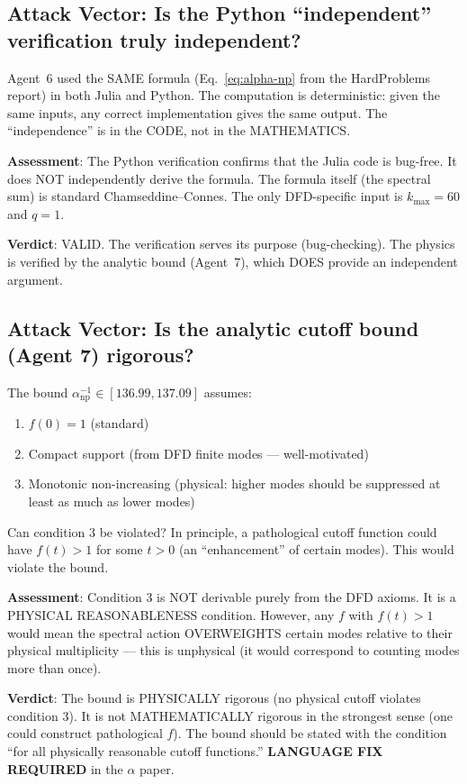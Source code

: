 \documentclass[11pt,a4paper]{article}
\begin{document}
\subsection{Attack Vector: Is the Python ``independent'' verification truly independent?}

Agent~6 used the SAME formula (Eq.~\ref{eq:alpha-np} from the HardProblems report) in both Julia and Python. The computation is deterministic: given the same inputs, any correct implementation gives the same output. The ``independence'' is in the CODE, not in the MATHEMATICS.

\textbf{Assessment}: The Python verification confirms that the Julia code is bug-free. It does NOT independently derive the formula. The formula itself (the spectral sum) is standard Chamseddine--Connes. The only DFD-specific input is $k_{\max} = 60$ and $q = 1$.

\textbf{Verdict}: VALID. The verification serves its purpose (bug-checking). The physics is verified by the analytic bound (Agent~7), which DOES provide an independent argument.

\subsection{Attack Vector: Is the analytic cutoff bound (Agent 7) rigorous?}

The bound $\alpha^{-1}_{\mathrm{np}} \in [136.99, 137.09]$ assumes:
\begin{enumerate}
\item $f(0) = 1$ (standard)
\item Compact support (from DFD finite modes --- well-motivated)
\item Monotonic non-increasing (physical: higher modes should be suppressed at least as much as lower modes)
\end{enumerate}

Can condition 3 be violated? In principle, a pathological cutoff function could have $f(t) > 1$ for some $t > 0$ (an ``enhancement'' of certain modes). This would violate the bound.

\textbf{Assessment}: Condition 3 is NOT derivable purely from the DFD axioms. It is a PHYSICAL REASONABLENESS condition. However, any $f$ with $f(t) > 1$ would mean the spectral action OVERWEIGHTS certain modes relative to their physical multiplicity --- this is unphysical (it would correspond to counting modes more than once).

\textbf{Verdict}: The bound is PHYSICALLY rigorous (no physical cutoff violates condition 3). It is not MATHEMATICALLY rigorous in the strongest sense (one could construct pathological $f$). The bound should be stated with the condition ``for all physically reasonable cutoff functions.'' \textbf{LANGUAGE FIX REQUIRED} in the $\alpha$ paper.
\end{document}
